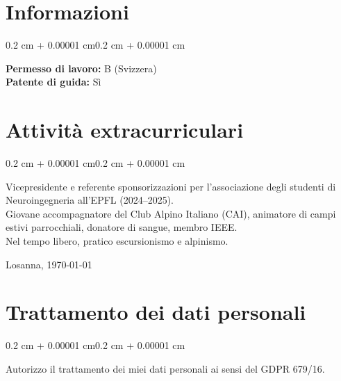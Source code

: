 \documentclass[10pt, letterpaper]{article}
\newenvironment{onecolentry}{
    \begin{adjustwidth}{0.2 cm + 0.00001 cm}{0.2 cm + 0.00001 cm}
}{
    \end{adjustwidth}
}
\begin{document}
    \section{Informazioni}

    \begin{onecolentry}
        \textbf{Permesso di lavoro:} B (Svizzera) \\
        \textbf{Patente di guida:} Sì \\
    \end{onecolentry}

    \section{Attività extracurriculari}

    \begin{onecolentry}
        Vicepresidente e referente sponsorizzazioni per l'associazione degli studenti di Neuroingegneria all'EPFL (2024--2025).\\
        Giovane accompagnatore del Club Alpino Italiano (CAI), animatore di campi estivi parrocchiali, donatore di sangue, membro IEEE.\\
        Nel tempo libero, pratico escursionismo e alpinismo.
    \end{onecolentry}

    \vspace{\fill}
    Losanna, \today

    \section{Trattamento dei dati personali}
    \begin{onecolentry}
        Autorizzo il trattamento dei miei dati personali ai sensi del GDPR 679/16.
    \end{onecolentry}
\end{document}
